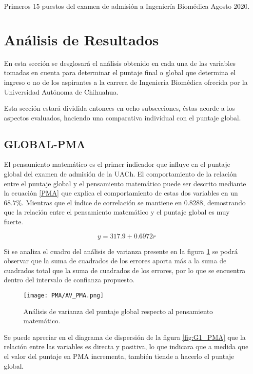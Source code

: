 \documentclass{article}
\begin{document}
\begin{table}[H]
\caption{Primeros 15 puestos del examen de admisión a Ingeniería Biomédica Agosto 2020.}
\label{IB_PUESTOS}
\end{table}

\section{Análisis de Resultados}

En esta sección se desglosará el análisis obtenido en cada una de las variables tomadas en cuenta para determinar el puntaje final o global que determina el ingreso o no de los aspirantes a la carrera de Ingeniería Biomédica ofrecida por la Universidad Autónoma de Chihuahua.

Esta sección estará dividida entonces en ocho subsecciones, éstas acorde a los aspectos evaluados, haciendo una comparativa individual con el puntaje global.

\subsection{GLOBAL-PMA}

El pensamiento matemático es el primer indicador que influye en el puntaje global del examen de admisión de la UACh. El comportamiento de la relación entre el puntaje global y el pensamiento matemático puede ser descrito mediante la ecuación \ref{PMA} que explica el comportamiento de estas dos variables en un $68.7\%$. Mientras que el índice de correlación se mantiene en $0.8288$, demostrando que la relación entre el pensamiento matemático y el puntaje global es muy fuerte.

\begin{equation}
    y = 317.9 + 0.6972r
    \label{PMA}
\end{equation}

Si se analiza el cuadro del análisis de varianza presente en la figura \ref{fig:AV_PMA} se podrá observar que la suma de cuadrados de los errores aporta más a la suma de cuadrados total que la suma de cuadrados de los errores, por lo que se encuentra dentro del intervalo de confianza propuesto.

\begin{figure}[H]
    \centering
    \texttt{[image: PMA/AV\_PMA.png]}
    \caption{Análisis de varianza del puntaje global respecto al pensamiento matemático.}
    \label{fig:AV_PMA}
\end{figure}

Se puede apreciar en el diagrama de dispersión de la figura \ref{fig:G1_PMA} que la relación entre las variables es directa y positiva, lo que indicara que a medida que el valor del puntaje en PMA incrementa, también tiende a hacerlo el puntaje global.
\end{document}
